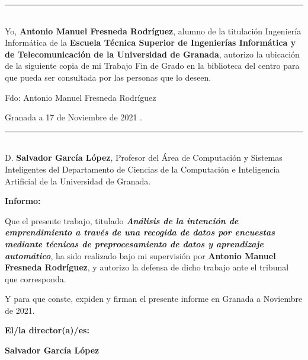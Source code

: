 {{{{\noindent\rule[-1ex]{\textwidth}{2pt}\\[4.5ex]

Yo, \textbf{Antonio Manuel Fresneda Rodríguez}, alumno de la titulación Ingeniería Informática de la \textbf{Escuela Técnica Superior de Ingenierías Informática y de Telecomunicación de la Universidad de Granada}, autorizo la ubicación de la siguiente copia de mi Trabajo Fin de Grado en la biblioteca del centro para que pueda ser consultada por las personas que lo deseen.
\vspace{6cm}

\noindent Fdo: Antonio Manuel Fresneda Rodríguez
\vspace{2cm}
\begin{flushright}
	Granada a 17 de Noviembre de 2021 .
\end{flushright}

\cleardoublepage
\thispagestyle{empty}

\noindent\rule[-1ex]{\textwidth}{2pt}\\[4.5ex]

D. \textbf{Salvador García López}, Profesor del Área de Computación y Sistemas Inteligentes del Departamento de Ciencias de la Computación e Inteligencia Artificial de la Universidad de Granada.

\vspace{0.5cm}

\textbf{Informo:}

\vspace{0.5cm}

Que el presente trabajo, titulado \textit{\textbf{ Análisis de la intención de emprendimiento a través de una recogida de datos por encuestas mediante técnicas de preprocesamiento de datos y aprendizaje automático}},
ha sido realizado bajo mi supervisión por \textbf{Antonio Manuel Fresneda Rodríguez}, y autorizo la defensa de dicho trabajo ante el tribunal
que corresponda.

\vspace{0.5cm}

Y para que conste, expiden y firman el presente informe en Granada a Noviembre de 2021.

\vspace{1cm}

\textbf{El/la director(a)/es: }

\vspace{5cm}

\noindent \textbf{Salvador García López}
\pagebreak
}}}}
